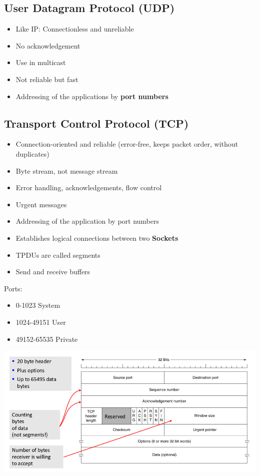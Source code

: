 \documentclass[11pt,ngerman]{article}
\begin{document}
\subsection{User	Datagram	Protocol	(UDP)}
\begin{itemize}[noitemsep,nolistsep]
	\item Like	IP:	Connectionless	and	unreliable
	\item No	acknowledgement
	\item Use	in	multicast
	\item Not reliable but fast
	\item Addressing	of	the	applications	by	\textbf{port numbers}
\end{itemize}

\subsection{Transport	Control	Protocol	(TCP)}
\begin{itemize}[noitemsep,nolistsep]
	\item Connection-oriented	and	reliable	(error-free,	keeps	packet	order,	without	duplicates)
	\item Byte	stream,	not	message	stream
	\item Error	handling,	acknowledgements,	flow	control	
	\item Urgent messages
	\item Addressing	of	the	application	by	port	numbers
	\item Establishes	logical	connections	between	two	\textbf{Sockets}
	\item TPDUs	are	called	segments
	\item Send	and 	receive	buffers\\
\end{itemize}

Ports:
\begin{itemize}[noitemsep,nolistsep]
\item 0-1023	System
\item 1024-49151 User
\item 49152-65535 Private
\end{itemize}

\includegraphics[width=6in]{images/Selection_021.png}\\
\end{document}
